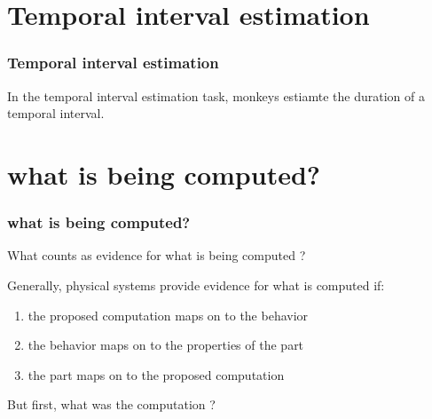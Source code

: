 \documentclass{beamer}
\begin{document}

\section{Temporal interval estimation}
\begin{frame}
\frametitle{\textbf{Temporal interval estimation} }

In the temporal interval estimation task, monkeys estiamte the duration of a temporal interval.


\end{frame}


\section{what is being computed?}
\begin{frame}
\frametitle{\textbf{what is being computed?} }
What counts as evidence for what is being computed ?

Generally, physical systems provide evidence for what is computed if:

\begin{enumerate}
    \item the proposed computation maps on to the behavior
    \item the behavior maps on to the properties of the part
    \item the part maps on to the proposed computation
\end{enumerate}

But first, what was the computation ?


\end{frame}
\end{document}
